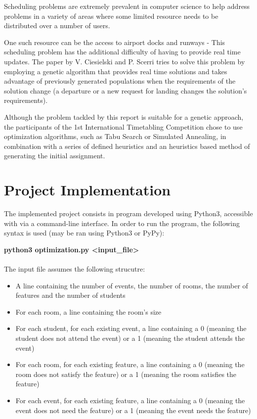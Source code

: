 \documentclass[conference]{IEEEtran}
\begin{document}
Scheduling problems are extremely prevalent in computer science to help address problems in a variety of areas where some limited resource needs to be distributed over a number of users.

One such resource can be the access to airport docks and runways - This scheduling problem has the additional difficulty of having to provide real time updates. The paper by V. Ciesielski and P. Scerri \cite{air} tries to solve this problem by employing a genetic algorithm that provides real time solutions and takes advantage of previously generated populations when the requirements of the solution change (a departure or a new request for landing changes the solution's requirements).

Although the problem tackled by this report is suitable for a genetic approach, the participants of the 1st International Timetabling Competition chose to use optimization algorithms, such as Tabu Search \cite{sol2} or Simulated Annealing\cite{sol1}, in combination with a series of defined heuristics and an heuristics based method of generating the initial assignment. 

\section{Project Implementation}

The implemented project consists in program developed using Python3, accessible with via a command-line interface. In order to run the program, the following syntax is used (may be ran using Python3 or PyPy):

\textbf{python3 optimization.py \textless input\_file\textgreater}
\\\\
The input file assumes the following strucutre:
\begin{itemize}
    \item A line containing the number of events, the number of rooms, the number of features and the number of students
    \item For each room, a line containing the room's size
    \item For each student, for each existing event, a line containing a 0 (meaning the student does not attend the event) or a 1 (meaning the student attends the event)
    \item For each room, for each existing feature, a line containing a 0 (meaning the room does not satisfy the feature) or a 1 (meaning the room satisfies the feature)
    \item For each event, for each existing feature, a line containing a 0 (meaning the event does not need the feature) or a 1 (meaning the event needs the feature)
\end{itemize}
\end{document}
